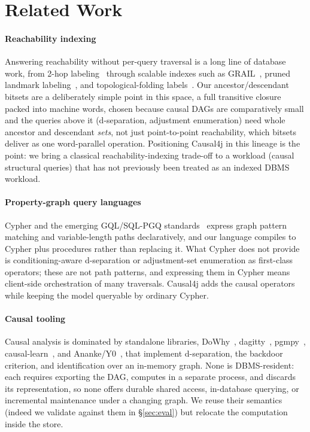 \section{Related Work}\label{sec:related}

\paragraph{Reachability indexing}
Answering reachability without per-query traversal is a long line of database
work, from 2-hop labeling~\cite{TODO_2hop} through scalable indexes such as
GRAIL~\cite{TODO_grail}, pruned landmark labeling~\cite{TODO_pll}, and
topological-folding labels~\cite{TODO_tflabel}. Our ancestor/descendant bitsets
are a deliberately simple point in this space, a full transitive closure packed
into machine words, chosen because causal DAGs are comparatively small and the
queries above it (d-separation, adjustment enumeration) need whole ancestor and
descendant \emph{sets}, not just point-to-point reachability, which bitsets
deliver as one word-parallel operation. Positioning Causal4j in this lineage is
the point: we bring a classical reachability-indexing trade-off to a workload
(causal structural queries) that has not previously been treated as an indexed
DBMS workload.

\paragraph{Property-graph query languages}
Cypher and the emerging GQL/SQL-PGQ standards~\cite{TODO_gql} express graph
pattern matching and variable-length paths declaratively, and our language
compiles to Cypher plus procedures rather than replacing it. What Cypher does not
provide is conditioning-aware d-separation or adjustment-set enumeration as
first-class operators; these are not path patterns, and expressing them in Cypher
means client-side orchestration of many traversals. Causal4j adds the causal
operators while keeping the model queryable by ordinary Cypher.

\paragraph{Causal tooling}
Causal analysis is dominated by standalone libraries, DoWhy~\cite{TODO_dowhy},
dagitty~\cite{TODO_dagitty}, pgmpy~\cite{TODO_pgmpy},
causal-learn~\cite{TODO_causallearn}, and Ananke/Y0~\cite{TODO_ananke}, that
implement d-separation, the backdoor criterion, and identification over an
in-memory graph. None is DBMS-resident: each requires exporting the DAG, computes
in a separate process, and discards its representation, so none offers durable
shared access, in-database querying, or incremental maintenance under a changing
graph. We reuse their semantics (indeed we validate against them in
\S\ref{sec:eval}) but relocate the computation inside the store.

